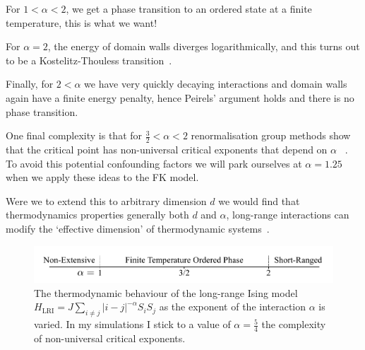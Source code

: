 For \(1 < \alpha < 2\), we get a phase transition to an ordered state at a finite temperature, this is what we want!

For \(\alpha = 2\), the energy of domain walls diverges logarithmically, and this turns out to be a Kostelitz-Thouless transition~\autocite{thoulessLongRangeOrderOneDimensional1969}.

Finally, for \(2 < \alpha\) we have very quickly decaying interactions and domain walls again have a finite energy penalty, hence Peirels' argument holds and there is no phase transition.

One final complexity is that for \(\tfrac{3}{2} < \alpha < 2\) renormalisation group methods show that the critical point has non-universal critical exponents that depend on \(\alpha\) ~\autocite{fisherCriticalExponentsLongRange1972}. To avoid this potential confounding factors we will park ourselves at \(\alpha = 1.25\) when we apply these ideas to the FK model.

Were we to extend this to arbitrary dimension \(d\) we would find that thermodynamics properties generally both \(d\) and \(\alpha\), long-range interactions can modify the `effective dimension' of thermodynamic systems~\autocite{angeliniRelationsShortrangeLongrange2014}.

\hypertarget{fig:alpha_diagram}{%
\begin{figure}
\centering
\includegraphics[width=1\textwidth,height=\textheight]{figure_code/background_chapter/alpha_diagram}
\caption[{Long-Range Ising Model Behaviour}]{The thermodynamic behaviour of the long-range Ising model \(H_{\mathrm{LRI}} = J \sum_{i\neq j} |i - j|^{-\alpha} S_i S_j\) as the exponent of the interaction \(\alpha\) is varied. In my simulations I stick to a value of \(\alpha = \tfrac{5}{4}\) the complexity of non-universal critical exponents.}
\label{fig:alpha_diagram}
\end{figure}
}
